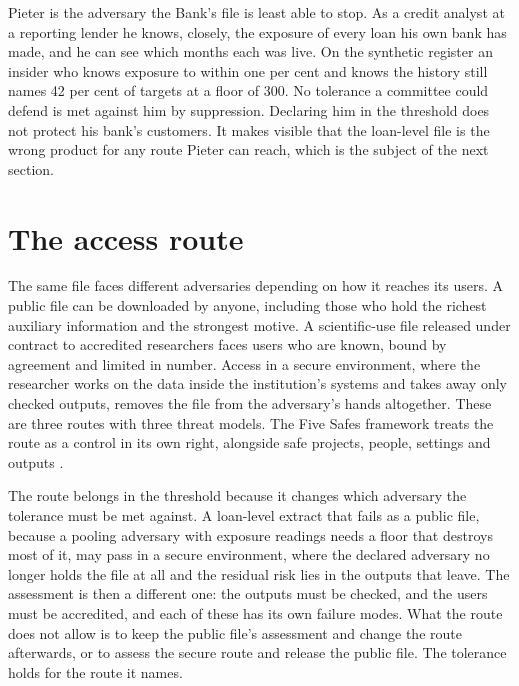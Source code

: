 Pieter is the adversary the Bank's file is least able to stop. As a credit analyst
at a reporting lender he knows, closely, the exposure of every loan his own bank
has made, and he can see which months each was live. On the synthetic register an
insider who knows exposure to within one per cent and knows the history still
names 42 per cent of targets at a floor of 300.
No tolerance a committee could defend is met against him by suppression. Declaring
him in the threshold does not protect his bank's customers. It makes visible that
the loan-level file is the wrong product for any route Pieter can reach, which is
the subject of the next section.

\syntheticnote


\section{The access route}\label{c07:sec-route}

The same file faces different adversaries depending on how it reaches its users.
A public file can be downloaded by anyone, including those who hold the richest
auxiliary information and the strongest motive. A scientific-use file released
under contract to accredited researchers faces users who are known, bound by
agreement and limited in number. Access in a secure environment, where the
researcher works on the data inside the institution's systems and takes away only
checked outputs, removes the file from the adversary's hands altogether. These are
three routes with three threat models. The Five Safes framework treats the route as
a control in its own right, alongside safe projects, people, settings and outputs
\citep{desai2016}.

The route belongs in the threshold because it changes which adversary the
tolerance must be met against. A loan-level extract that fails as a public file,
because a pooling adversary with exposure readings needs a floor that destroys most
of it, may pass in a secure environment, where the declared adversary no longer
holds the file at all and the residual risk lies in the outputs that leave. The
assessment is then a different one: the outputs must be checked, and the users
must be accredited, and each of these has its own failure modes. What the route
does not allow is to keep the public file's assessment and change the route
afterwards, or to assess the secure route and release the public file. The
tolerance holds for the route it names.

